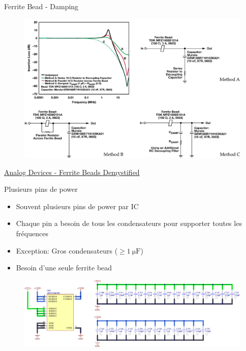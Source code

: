 \begin{frame}{Ferrite Bead - Damping}
    \begin{figure}
        \includegraphics[width=\textwidth, height=0.75\textheight, keepaspectratio]{pictures/ferrite-bead-ringing-damping.png}
    \end{figure}
    \href{https://www.analog.com/en/resources/analog-dialogue/articles/ferrite-beads-demystified.html}{Analog Devices - Ferrite Beads Demystified}
\end{frame}

\begin{frame}{Plusieurs pins de power}
    \begin{itemize}
        \item Souvent plusieurs pins de power par IC
        \item Chaque pin a besoin de tous les condensateurs pour supporter toutes les fréquences
        \item Exception: Gros condensateurs ($\geq \SI{1}{\micro\farad}$)
        \item Besoin d'une seule ferrite bead
    \end{itemize}
    \begin{figure}
        \includegraphics[width=\textwidth, height=0.75\textheight, keepaspectratio]{pictures/decoupling-example-dac.png}
    \end{figure}
\end{frame}


